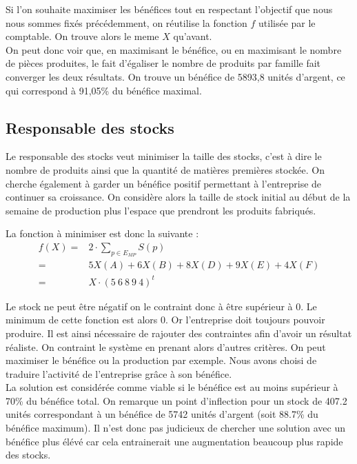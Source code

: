 \documentclass[a4paper, 11pt]{article}
\begin{document}
Si l’on souhaite maximiser les bénéfices tout en respectant l’objectif que nous
nous sommes fixés précédemment, on réutilise la fonction $f$ utilisée par le
comptable. On trouve alors le meme $X$ qu'avant. \\

On peut donc voir que, en maximisant le bénéfice, ou en maximisant le nombre de
pièces produites, le fait d’égaliser le nombre de produits par famille fait
converger les deux résultats. On trouve un bénéfice de 5893,8 unités d’argent,
ce qui correspond à 91,05\% du bénéfice maximal.

\subsection{Responsable des stocks}
Le responsable des stocks veut minimiser la taille des stocks, c'est à dire le
nombre de produits ainsi que la quantité de matières premières stockée. On
cherche également à garder un bénéfice positif permettant à l'entreprise de
continuer sa croissance. On considère alors la taille de stock initial au début
de la semaine de production plus l'espace que prendront les produits fabriqués.

La fonction à minimiser est donc la suivante : \\
$$
\begin{array}{rl}
    f(X) = & 2\cdot \sum_{p\in E_{MP}} S(p) \\
    = & 5 X(A) + 6 X(B) + 8 X(D) + 9 X(E) + 4 X(F) \\
    = & X\cdot(5~6~8~9~4)^t
\end{array}
$$

Le stock ne peut être négatif on le contraint donc à être supérieur à 0. Le
minimum de cette fonction est alors 0. Or l'entreprise doit toujours pouvoir
produire. Il est ainsi nécessaire de rajouter des contraintes afin d'avoir un
résultat réaliste. On contraint le système en prenant alors d'autres
critères. On peut maximiser le bénéfice ou la production par exemple. Nous
avons choisi de traduire l’activité de l’entreprise grâce à son bénéfice. \\


La solution est considérée comme viable si le bénéfice est au moins supérieur à
70\% du bénéfice total. On remarque un point d’inflection pour un stock de
407.2 unités correspondant à un bénéfice de 5742 unités d’argent (soit 88.7\% du
bénéfice maximum). Il n’est donc pas judicieux de chercher une solution avec
un bénéfice plus élévé car cela entrainerait une augmentation beaucoup plus
rapide des stocks. \\
\end{document}
